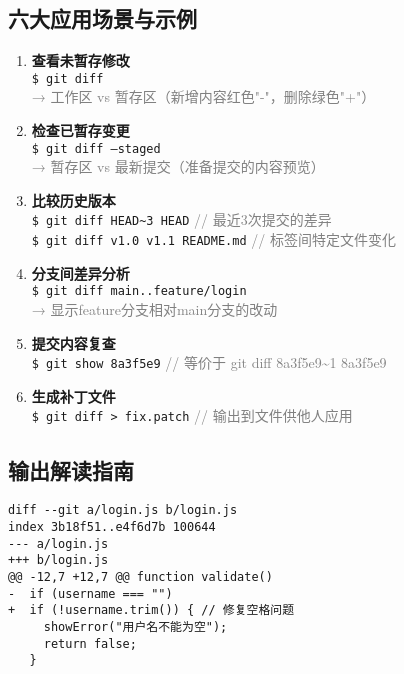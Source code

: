 \subsection{六大应用场景与示例}
\begin{enumerate}[leftmargin=*, nosep]
    \item \textbf{查看未暂存修改} \\
    \texttt{\$ git diff} \\
    \textcolor{gray}{→ 工作区 vs 暂存区（新增内容红色"-"，删除绿色"+"）}
    
    \item \textbf{检查已暂存变更} \\
    \texttt{\$ git diff --staged} \\
    \textcolor{gray}{→ 暂存区 vs 最新提交（准备提交的内容预览）}
    
    \item \textbf{比较历史版本} \\
    \texttt{\$ git diff HEAD\textasciitilde3 HEAD} \quad \textcolor{gray}{// 最近3次提交的差异} \\
    \texttt{\$ git diff v1.0 v1.1 README.md} \quad \textcolor{gray}{// 标签间特定文件变化}
    
    \item \textbf{分支间差异分析} \\
    \texttt{\$ git diff main..feature/login} \\
    \textcolor{gray}{→ 显示feature分支相对main分支的改动}
    
    \item \textbf{提交内容复查} \\
    \texttt{\$ git show 8a3f5e9} \quad \textcolor{gray}{// 等价于 git diff 8a3f5e9\textasciitilde1 8a3f5e9}
    
    \item \textbf{生成补丁文件} \\
    \texttt{\$ git diff > fix.patch} \quad \textcolor{gray}{// 输出到文件供他人应用}
\end{enumerate}

\subsection{输出解读指南}
\begin{verbatim}
diff --git a/login.js b/login.js
index 3b18f51..e4f6d7b 100644
--- a/login.js
+++ b/login.js
@@ -12,7 +12,7 @@ function validate() 
-  if (username === "") 
+  if (!username.trim()) { // 修复空格问题
     showError("用户名不能为空");
     return false;
   }
\end{verbatim}

